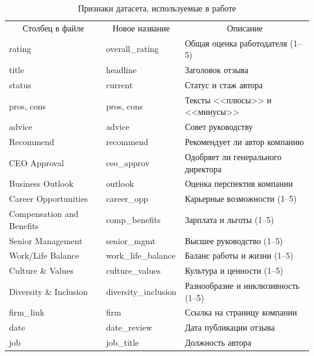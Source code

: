 \begin{table}[!ht]
    \centering
    \small
    \begin{tabularx}{\textwidth}{|p{4.6cm}|p{4.2cm}|X|}
        \hline
        \multicolumn{1}{|c|}{Столбец в файле} & \multicolumn{1}{c|}{Новое название} & \multicolumn{1}{c|}{Описание} \\ \hhline{|=|=|=|}
        rating                    & overall\_rating      & Общая оценка работодателя (1--5) \\ \hline
        title                     & headline             & Заголовок отзыва \\ \hline
        status                    & current              & Статус и стаж автора \\ \hline
        pros, cons                & pros, cons           & Тексты <<плюсы>> и <<минусы>> \\ \hline
        advice                    & advice               & Совет руководству \\ \hline
        Recommend                 & recommend            & Рекомендует ли автор компанию \\ \hline
        CEO Approval              & ceo\_approv          & Одобряет ли генерального директора \\ \hline
        Business Outlook          & outlook              & Оценка перспектив компании \\ \hline
        Career Opportunities      & career\_opp          & Карьерные возможности (1--5) \\ \hline
        Compensation and Benefits & comp\_benefits       & Зарплата и льготы (1--5) \\ \hline
        Senior Management         & senior\_mgmt         & Высшее руководство (1--5) \\ \hline
        Work/Life Balance         & work\_life\_balance  & Баланс работы и жизни (1--5) \\ \hline
        Culture \& Values         & culture\_values      & Культура и ценности (1--5) \\ \hline
        Diversity \& Inclusion    & diversity\_inclusion & Разнообразие и инклюзивность (1--5) \\ \hline
        firm\_link                & firm                 & Ссылка на страницу компании \\ \hline
        date                      & date\_review         & Дата публикации отзыва \\ \hline
        job                       & job\_title           & Должность автора \\ \hline
    \end{tabularx}
    \caption{Признаки датасета, используемые в работе}
    \label{tab:features}
\end{table}

